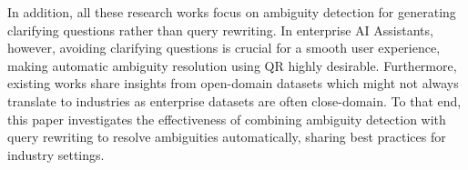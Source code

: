 In addition, all these research works focus on ambiguity detection for generating clarifying questions rather than query rewriting. In enterprise AI Assistants, however, avoiding clarifying questions is crucial for a smooth user experience, making automatic ambiguity resolution using QR
highly desirable. Furthermore, existing works share insights from open-domain datasets which might not always translate to industries as enterprise datasets are often close-domain. To that end, this paper investigates the effectiveness of combining ambiguity detection with query rewriting to resolve ambiguities automatically, sharing best practices for industry settings.